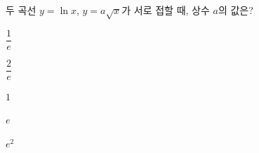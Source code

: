 두 곡선 $y=\ln x$, $y=a\sqrt{x}$가 서로 접할 때, 상수 $a$의 값은?
\begin{choices32}{\rule[-3ex]{0pt}{8ex}$\dfrac{1}{e}$}{\rule[-3ex]{0pt}{8ex}$\dfrac{2}{e}$}{\rule[-3ex]{0pt}{8ex}$1$}{\rule[-3ex]{0pt}{8ex}$e$}{\rule[-3ex]{0pt}{8ex}$e^2$}\end{choices32}
